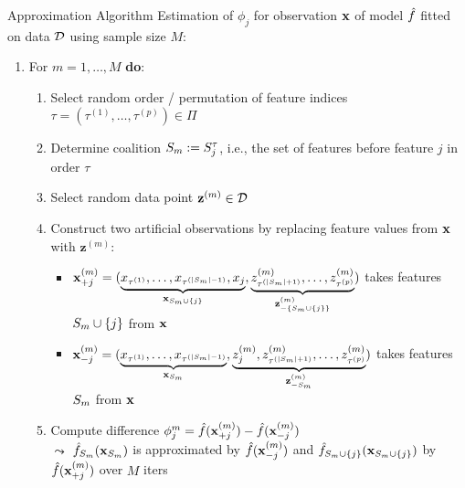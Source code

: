 \documentclass[11pt,compress,t,notes=noshow, aspectratio=169, xcolor=table]{beamer}
\begin{document}
\begin{frame}{Approximation Algorithm }
Estimation of $\phi_j$ for observation $\xv$ of model $\fh$ fitted on data $\D$ using sample size $M$:
  \begin{enumerate}[<+->]
      \item For $m = 1, \ldots, M$ \textbf{do}:
      \begin{enumerate}
        \item Select random order / permutation of feature indices $\tau = (\tau^{(1)}, \ldots, \tau^{(p)}) \in \Pi$
        \item Determine coalition $\Sm := \Stau$, i.e., the set of features before feature $j$ in order $\tau$
        \item Select random data point $\mathbf{z}^{(m)} \in \D$%
        \item Construct two artificial observations by replacing feature values from $\xv$ with $\mathbf{z}^{(m)}$:
          \begin{itemize}
          \setlength\itemsep{.5em}
            \item %
            $ \xjp  = (\underbrace{x_{\tau^{(1)}}, \ldots, x_{\tau^{(|\Sm|-1)}}, x_{j}}_{\xv_{\Smj}}, \underbrace{z_{\tau^{(|\Sm|+1)}}^{(m)} , \ldots, z_{\tau^{(p)}}^{(m)}}_{\mathbf{z}^{(m)}_{\minusSmj}} )$
            takes features $\Smj$ from $\xv$
            \item %
            $ \xjm = (\underbrace{x_{\tau^{(1)}}, \ldots, x_{\tau^{(|\Sm|-1)}}}_{\xv_{\Sm}}, \underbrace{z_{j}^{(m)} , z_{\tau^{(|\Sm|+1)}}^{(m)} , \ldots, z_{\tau^{(p)}}^{(m)}}_{\mathbf{z}^{(m)}_{-\Sm}} )$
            takes features $\Sm$ from $\xv$
          \end{itemize}
        \item Compute difference $\phi_j^m = \fh(\xjp) - \fh(\xjm)$ \\
        $\leadsto$ $\fh_{\Sm}(\xv_{\Sm})$ is approximated by $\fh(\xv_{-j}^{(m)})$ and  $\fh_{\Smj}(\xv_{\Smj})$ by  $\fh(\xv_{+j}^{(m)})$ over $M$ iters
        \end{enumerate}
        

\end{enumerate}
\end{frame}
\end{document}
